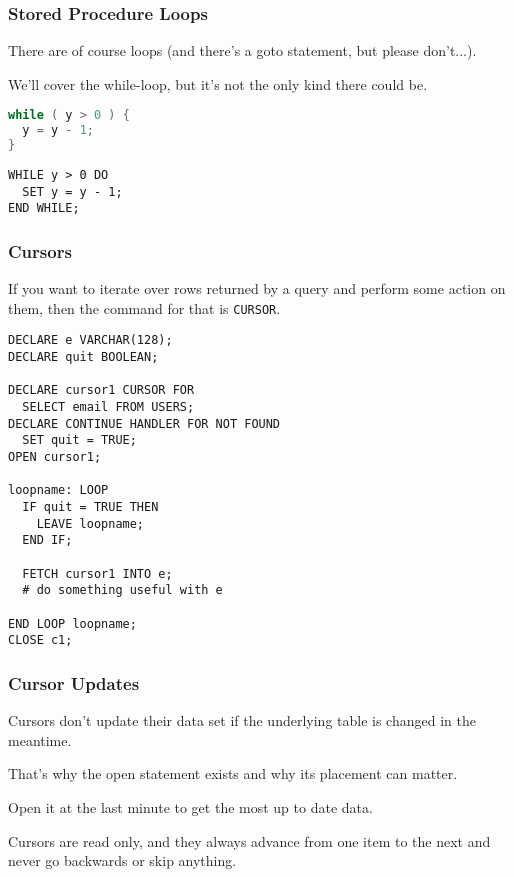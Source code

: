 \begin{frame}[fragile]
\frametitle{Stored Procedure Loops}

There are of course loops (and there's a goto statement, but please don't...). 

We'll cover the while-loop, but it's not the only kind there could be.

\begin{multicols}{2}
\begin{lstlisting}[language=C]
while ( y > 0 ) {
  y = y - 1;
} 
\end{lstlisting}
\columnbreak
\begin{verbatim}
WHILE y > 0 DO
  SET y = y - 1;
END WHILE;
\end{verbatim}
\end{multicols}

\end{frame}

\begin{frame}[fragile]
\frametitle{Cursors}

If you want to iterate over rows returned by a query and perform some action on them, then the command for that is \texttt{CURSOR}. 

{\scriptsize
\begin{verbatim}
DECLARE e VARCHAR(128);
DECLARE quit BOOLEAN;

DECLARE cursor1 CURSOR FOR 
  SELECT email FROM USERS;
DECLARE CONTINUE HANDLER FOR NOT FOUND
  SET quit = TRUE;  
OPEN cursor1;

loopname: LOOP
  IF quit = TRUE THEN
    LEAVE loopname;
  END IF;

  FETCH cursor1 INTO e;
  # do something useful with e

END LOOP loopname;
CLOSE c1;
\end{verbatim}
}


\end{frame}

\begin{frame}
\frametitle{Cursor Updates}

Cursors don't update their data set if the underlying table is changed in the meantime. 

That's why the open statement exists and why its placement can matter. 

Open it at the last minute to get the most up to date data. 

Cursors are read only, and they always advance from one item to the next and never go backwards or skip anything.

\end{frame}

